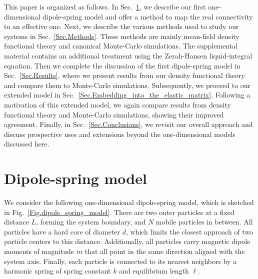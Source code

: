 \documentclass[aps,pre,twocolumn,superscriptaddress,nofootinbib]{revtex4}
\begin{document}
This paper is organized as follows. 
In Sec.~\ref{Sec.Dipole-spring_model}, we describe our first one-dimensional dipole-spring model and offer a method to map the real connectivity to an effective one.
Next, we describe the various methods used to study our systems in Sec.~\ref{Sec.Methods}. 
These methods are mainly mean-field density functional theory and canonical Monte-Carlo simulations. 
The supplemental material \cite{supplemental} contains an additional treatment using the Zerah-Hansen liquid-integral equation. 
Then we complete the discussion of the first dipole-spring model in Sec.~\ref{Sec.Results}, where we present results from our density functional theory and compare them to Monte-Carlo simulations. 
Subsequently, we proceed to our extended model in Sec.~\ref{Sec.Embedding_into_the_elastic_matrix}. 
Following a motivation of this extended model, we again compare results from density functional theory and Monte-Carlo simulations, showing their improved agreement. 
Finally, in Sec.~\ref{Sec.Conclusions}, we revisit our overall approach and discuss prospective uses and extensions beyond the one-dimensional models discussed here. 

\section{Dipole-spring model}
\label{Sec.Dipole-spring_model}

We consider the following one-dimensional dipole-spring model, which is sketched in Fig.~\ref{Fig.dipole_spring_model}.
There are two outer particles at a fixed distance $L$, forming the system boundary, and $N$ mobile particles in between. 
All particles have a hard core of diameter $d$, which limits the closest approach of two particle centers to this distance. 
Additionally, all particles carry magnetic dipole moments of magnitude $m$ that all point in the same direction aligned with the system axis. 
Finally, each particle is connected to its nearest neighbors by a harmonic spring of spring constant $k$ and equilibrium length $\ell$.
\end{document}
